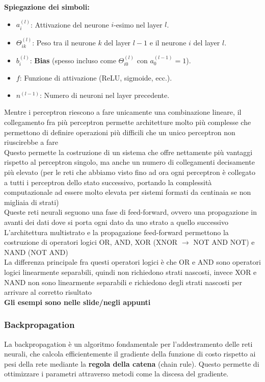 \documentclass[10pt,oneside,a4paper]{article}
\begin{document}
	\textbf{Spiegazione dei simboli:}
	\begin{itemize}
		\item $a_i^{(l)}$: Attivazione del neurone $i$-esimo nel layer $l$.
		\item $\Theta_{ik}^{(l)}$: Peso tra il neurone $k$ del layer $l-1$ e il neurone $i$ del layer $l$.
		\item $b_i^{(l)}$: \textbf{Bias} (spesso incluso come $\Theta_{i0}^{(l)}$ con $a_0^{(l-1)} = 1$).
		\item $f$: Funzione di attivazione (ReLU, sigmoide, ecc.).
		\item $n^{(l-1)}$: Numero di neuroni nel layer precedente.
	\end{itemize}
	Mentre i perceptron riescono a fare unicamente una combinazione lineare, il collegamento fra più perceptron permette architetture molto più complesse che permettono di definire operazioni più difficili che un unico perceptron non riuscirebbe a fare\\
	Questo permette la costruzione di un sistema che offre nettamente più vantaggi rispetto al perceptron singolo, ma anche un numero di collegamenti decisamente più elevato (per le reti che abbiamo visto fino ad ora ogni perceptron è collegato a tutti i perceptron dello stato successivo, portando la complessità computazionale ad essere molto elevata per sistemi formati da centinaia se non migliaia di strati)\\
	Queste reti neurali seguono una fase di feed-forward, ovvero una propagazione in avanti dei dati dove si porta ogni dato da uno strato a quello successivo\\
	L'architettura multistrato e la propagazione feed-forward permettono la costruzione di operatori logici OR, AND, XOR (XNOR $\to$ NOT AND NOT) e NAND (NOT AND)\\
	La differenza principale fra questi operatori logici è che OR e AND sono operatori logici linearmente separabili, quindi non richiedono strati nascosti, invece XOR e NAND non sono linearmente separabili e richiedono degli strati nascosti per arrivare al corretto risultato\\
	\textbf{Gli esempi sono nelle slide/negli appunti}
	\subsubsection{Backpropagation}
	La backpropagation è un algoritmo fondamentale per l'addestramento delle reti neurali, che calcola efficientemente il gradiente della funzione di costo rispetto ai pesi della rete mediante la \textbf{regola della catena} (chain rule). Questo permette di ottimizzare i parametri attraverso metodi come la discesa del gradiente.
	
\end{document}
